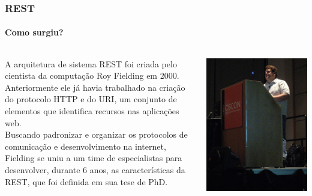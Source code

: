 \documentclass[
	9pt, %
	t, %
]{beamer}
\begin{document}
\begin{frame}
	\frametitle{REST}
	\framesubtitle<1>{Como surgiu?}

	\begin{columns}[c]
		\begin{column}{0.8\textwidth} %
			A arquitetura de sistema REST foi criada pelo cientista da computação \alert{Roy Fielding em 2000}. \\ \bigskip
			Anteriormente ele já havia trabalhado na criação do \alert{protocolo HTTP e do URI}, um conjunto de elementos que identifica recursos nas aplicações web.  \\ \bigskip
			Buscando padronizar e organizar os protocolos de comunicação e desenvolvimento na internet, Fielding se uniu a um time de especialistas para desenvolver, \alert{durante 6 anos}, as características da \alert{REST}, que foi definida em sua tese de PhD.
		\end{column}

		\begin{column}{0.2\textwidth} %
			\includegraphics[width=0.9\linewidth]{roy.jpg}
		\end{column}
	\end{columns}

\end{frame}
\end{document}
